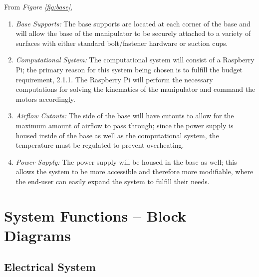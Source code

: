 \documentclass[12pt]{report}
\begin{document}
From \emph{Figure \ref{fig:base}},
\begin{enumerate}[label=\alph*.]
  \item \emph{Base Supports:}
  The base supports are located at each corner of the base and will allow the base of the manipulator to be securely attached to a variety of surfaces with either standard bolt/fastener hardware or suction cups.
  \item \emph{Computational System:}
  The computational system will consist of a Raspberry Pi; the primary reason for this system being chosen is to fulfill the budget requirement, 2.1.1. The Raspberry Pi will perform the necessary computations for solving the kinematics of the manipulator and command the motors accordingly.
  \item \emph{Airflow Cutouts:}
  The side of the base will have cutouts to allow for the maximum amount of airflow to pass through; since the power supply is housed inside of the base as well as the computational system, the temperature must be regulated to prevent overheating.
  \item \emph{Power Supply:}
  The power supply will be housed in the base as well; this allows the system to be more accessible and therefore more modifiable, where the end-user can easily expand the system to fulfill their needs.
\end{enumerate}
%
\newpage

\section{System Functions -- Block Diagrams}
\subsection{Electrical System}
\end{document}
